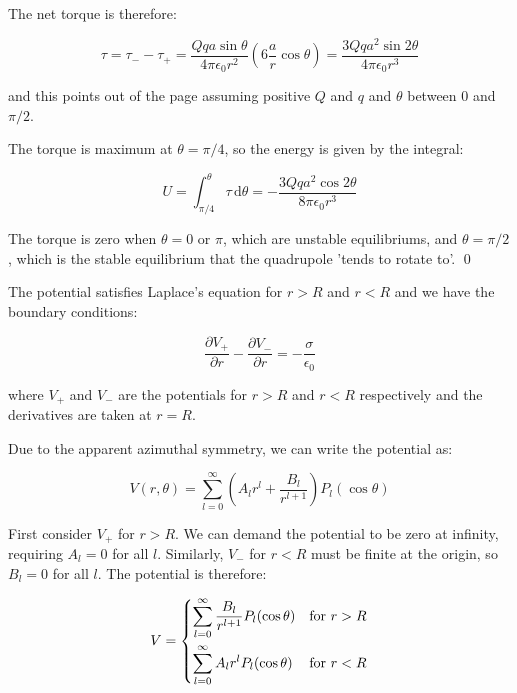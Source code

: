 \documentclass[12pt]{article}
\begin{document}
The net torque is therefore:

\begin{equation}
    \tau = \tau_{-} - \tau_{+} = \frac{Qqa\sin{\theta}}{4\pi\epsilon_{0}r^{2}} \left( 6\frac{a}{r} \cos{\theta} \right) = \frac{3Qqa^{2}\sin{2\theta}}{4\pi\epsilon_{0}r^{3}}
\end{equation}

and this points out of the page assuming positive $Q$ and $q$ and $\theta$ between $0$ and $\pi/2$.

The torque is maximum at $\theta = \pi/4$, so the energy is given by the integral:

\begin{equation}
    U = \int_{\pi/4}^{\theta} \tau \, \mathrm{d}\theta = -\frac{3Qqa^{2}\cos{2\theta}}{8\pi\epsilon_{0}r^{3}}
\end{equation}

The torque is zero when $\theta = 0$ or $\pi$, which are unstable equilibriums, and $\theta = \pi/2$, which is the stable equilibrium that the quadrupole 'tends to rotate to'.
\qed



The potential satisfies Laplace's equation for $r > R$ and $r < R$ and we have the boundary conditions:

\begin{equation}
    \frac{\partial V_{+}}{\partial r} - \frac{\partial V_{-}}{\partial r} = -\frac{\sigma}{\epsilon_{0}}
\end{equation}

where $V_{+}$ and $V_{-}$ are the potentials for $r > R$ and $r < R$ respectively and the derivatives are taken at $r = R$.

Due to the apparent azimuthal symmetry, we can write the potential as:

\begin{equation}
    V(r, \theta) = \sum_{l=0}^{\infty} \left( A_{l} r^{l} + \frac{B_{l}}{r^{l+1}} \right) P_{l}(\cos{\theta})
\end{equation}

First consider $V_{+}$ for $r > R$. We can demand the potential to be zero at infinity, requiring $A_{l} = 0$ for all $l$. Similarly, $V_{-}$ for $r < R$ must be finite at the origin, so $B_{l} = 0$ for all $l$. The potential is therefore:

\begin{equation}
V =
\begin{dcases}
    \sum_{l=0}^{\infty} \frac{B_{l}}{r^{l+1}} P_{l}(\cos{\theta}) & \text{for } r > R \\
    \sum_{l=0}^{\infty} A_{l} r^{l} P_{l}(\cos{\theta}) & \text{for } r < R
\end{dcases}
\end{equation}
\end{document}

